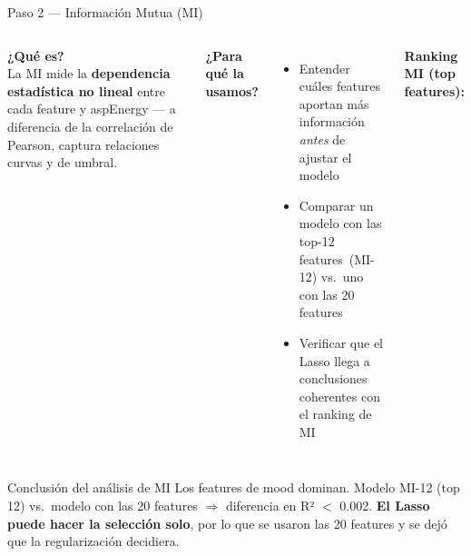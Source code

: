 \documentclass[aspectratio=169]{beamer}
\begin{document}
\begin{frame}{Paso 2 — Información Mutua (MI)}

  \begin{columns}
      \textbf{¿Qué es?}\\
      La MI mide la \textbf{dependencia estadística no lineal} entre cada feature y aspEnergy — a diferencia de la correlación de Pearson, captura relaciones curvas y de umbral.

      \bigskip
      \textbf{¿Para qué la usamos?}
      \begin{itemize}
        \item Entender cuáles features aportan más información \textit{antes} de ajustar el modelo
        \item Comparar un modelo con las top-12 features~(MI-12) vs.\ uno con las 20 features
        \item Verificar que el Lasso llega a conclusiones coherentes con el ranking de MI
      \end{itemize}

      \textbf{Ranking MI (top features):}
      \bigskip

  \end{columns}

  \bigskip
  \begin{block}{Conclusión del análisis de MI}
    \small Los features de mood dominan. Modelo MI-12 (top 12) vs.\ modelo con las 20 features $\Rightarrow$ diferencia en R² $<$ 0.002. \textbf{El Lasso puede hacer la selección solo}, por lo que se usaron las 20 features y se dejó que la regularización decidiera.
  \end{block}
\end{frame}
\end{document}
